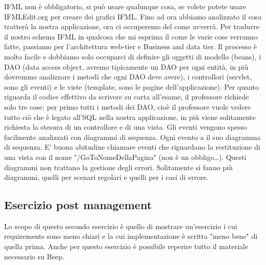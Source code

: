 IFML non è obbligatorio, si può usare qualunque cosa, se volete potete usare IFMLEdit.org per creare dei grafici IFML.\newline
\newline
Fino ad ora abbiamo analizzato il cosa tratterà la nostra applicazione, ora ci occuperemo del come avverrà.\newline
\newline
Per tradurre il nostro schema IFML in qualcosa che mi esprima il come le varie cose verranno fatte, passiamo per l'architettura web-tier e Business and data tier. Il processo è molto facile e dobbiamo solo occuparci di definire gli oggetti di modello (beans), i DAO (data access object, avremo tipicamente un DAO per ogni entità, in più dovremmo analizzare i metodi che ogni DAO deve avere), i controllori (servlet, sono gli eventi) e le viste (template, sono le pagine dell'applicazione).\newline
\newline
Per quanto riguarda il codice effettivo da scrivere su carta all'esame, il professore richiede solo tre cose: per primo tutti i metodi dei DAO, cioè il professore vuole vedere tutto ciò che è legato all'SQL nella nostra applicazione, in più viene solitamente richiesta la stesura di un controllore e di una vista.\newline
\newline
Gli eventi vengono spesso facilmente analizzati con diagrammi di sequenza. Ogni evento a il suo diagramma di sequenza.\newline
E' buona abitudine chiamare eventi che riguardano la restituzione di una vista con il nome "/GoToNomeDellaPagina" (non è un obbligo\dots).\newline
Questi diagrammi non trattano la gestione degli errori. Solitamente si fanno più diagrammi, quelli per scenari regolari e quelli per i casi di errore.
\subsection{Esercizio post management}
Lo scopo di questo secondo esercizio è quello di mostrare un'esercizio i cui requirements sono meno chiari e la cui implementazione è scritta "meno bene" di quella prima.\newline
\newline
Anche per questo esercizio è possibile reperire tutto il materiale necessario su Beep.\newline
\newline
